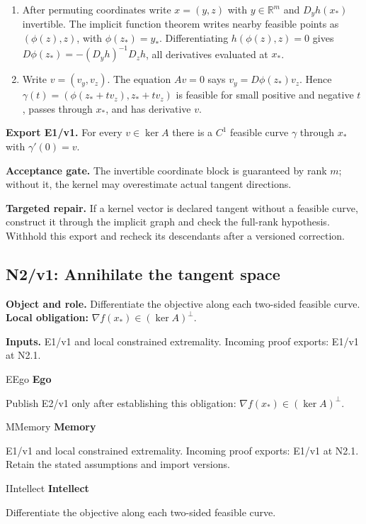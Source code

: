 \documentclass[preprint,12pt,aps,pra,showkeys,amsmath,amssymb,superscriptaddress,floatfix]{revtex4-2}
\theoremstyle{definition}
\theoremstyle{remark}
\newcommand{\mmfaculty}[3]{%
 \begin{mmfacultybox}{#1}{#2}
 {\sffamily\bfseries\color{MMBlue}#2}\par\smallskip #3
 \end{mmfacultybox}}
\newcommand{\field}[2]{\par\smallskip\noindent\textbf{#1.} #2\par}
\begin{document}
\begin{enumerate}[label=N1.\arabic*,leftmargin=3.4em]

\item After permuting coordinates write \(x=(y,z)\) with \(y\in\mathbb R^m\)
and \(D_yh(x_*)\) invertible. The implicit function theorem writes
nearby feasible points as \((\phi(z),z)\), with \(\phi(z_*)=y_*\).
Differentiating \(h(\phi(z),z)=0\) gives
\(D\phi(z_*)=-(D_yh)^{-1}D_zh\), all derivatives evaluated at \(x_*\).

\item Write \(v=(v_y,v_z)\). The equation \(Av=0\) says \(v_y=D\phi(z_*)v_z\).
Hence \(\gamma(t)=(\phi(z_*+tv_z),z_*+tv_z)\) is feasible for small
positive and negative \(t\), passes through \(x_*\), and has derivative
\(v\).

\end{enumerate}

\field{Export E1/v1}{For every \(v\in\ker A\) there is a \(C^1\) feasible curve \(\gamma\)
through \(x_*\) with \(\gamma'(0)=v\).}

\field{Acceptance gate}{The invertible coordinate block is guaranteed by rank \(m\); without it,
the kernel may overestimate actual tangent directions.}

\field{Targeted repair}{If a kernel vector is declared tangent without a feasible curve,
construct it through the implicit graph and check the full-rank
hypothesis. Withhold this export and recheck its descendants after a
versioned correction.}

\clearpage

\subsection{N2/v1: Annihilate the tangent space}

\field{Object and role}{Differentiate the objective along each two-sided feasible curve.
\textbf{Local obligation:} \(\nabla f(x_*)\in(\ker A)^\perp\).}

\field{Inputs}{E1/v1 and local constrained extremality. Incoming proof exports: E1/v1
at N2.1.}

\mmfaculty{E}{Ego}{Publish E2/v1 only after establishing this obligation:
\(\nabla f(x_*)\in(\ker A)^\perp\).}

\mmfaculty{M}{Memory}{E1/v1 and local constrained extremality. Incoming proof exports: E1/v1
at N2.1. Retain the stated assumptions and import versions.}

\mmfaculty{I}{Intellect}{Differentiate the objective along each two-sided feasible curve.}
\end{document}
